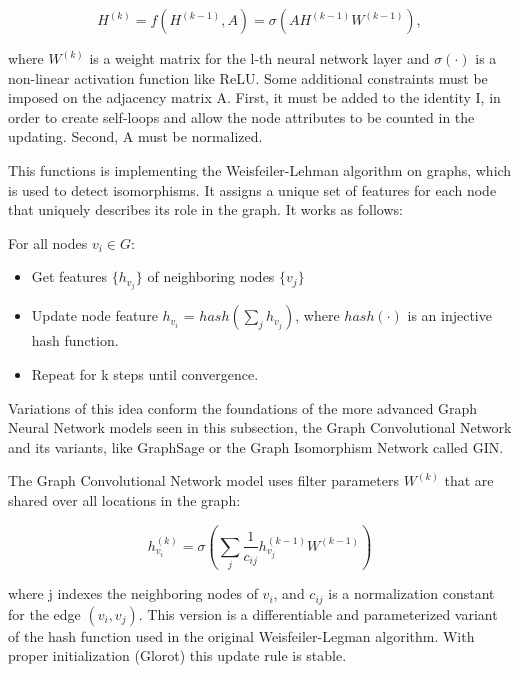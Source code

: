 $$H^{(k)} = f(H^{(k-1)},A) =  \sigma(AH^{(k-1)}W^{(k-1)}),$$

where $W^{(k)}$ is a weight matrix for the l-th neural network layer and $\sigma(·)$ is a non-linear activation function like ReLU. Some additional constraints must be imposed on the adjacency matrix A. First, it must be added to the identity I, in order to create self-loops and allow the node attributes to be counted in the updating. Second, A must be normalized.

This functions is implementing the Weisfeiler-Lehman algorithm on graphs, which is used to detect isomorphisms. It assigns a unique set of features for each node that uniquely describes its role in the graph. It works as follows:

For all nodes $v_i \in G$:
\begin{itemize}
\item Get features $\{ h_v_j \}$ of neighboring nodes $\{ v_j \}$
\item Update node feature $h_{v_i}$ = $hash(\sum_j h_v_j)$, where $hash(\cdot)$ is an injective hash function.
\item Repeat for k steps until convergence.
\end{itemize}

Variations of this idea conform the foundations of the more advanced Graph Neural Network models seen in this subsection, the Graph Convolutional Network and its variants, like GraphSage or the Graph Isomorphism Network called GIN.


The Graph Convolutional Network model uses filter parameters $W^{(k)}$ that are shared over all locations in the graph:

$$ h^{(k)}_{v_i} = \sigma(\sum_j \frac{1}{c_{ij}}h^{(k-1)}_{v_j}W^{(k-1)})$$

where j indexes the neighboring nodes of $v_i$, and $c_{ij}$ is a normalization constant for the edge $(v_i,v_j)$. This version is a differentiable and parameterized variant of the hash function used in the original Weisfeiler-Legman algorithm. With proper initialization (Glorot) this update rule is stable.





